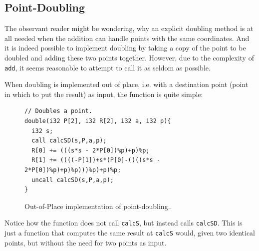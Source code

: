 \subsection{Point-Doubling}
The observant reader might be wondering, why an explicit doubling method is at all needed when the addition can handle points with the same coordinates. And it is indeed possible to implement doubling by taking a copy of the point to be doubled and adding these two points together. However, due to the complexity of \texttt{add}, it seems reasonable to attempt to call it as seldom as possible.

When doubling is implemented out of place, i.e. with a destination point (point in which to put the result) as input, the function is quite simple:
\begin{figure}[H]
\begin{Verbatim}
// Doubles a point.
double(i32 P[2], i32 R[2], i32 a, i32 p){ 
  i32 s;
  call calcSD(s,P,a,p);
  R[0] += (((s*s - 2*P[0])%p)+p)%p;
  R[1] += ((((-P[1])+s*(P[0]-((((s*s - 2*P[0])%p)+p)%p)))%p)+p)%p;
  uncall calcSD(s,P,a,p);
}
\end{Verbatim}
\caption{Out-of-Place implementation of point-doubling..}
\end{figure}
Notice how the function does not call \texttt{calcS}, but instead calls \texttt{calcSD}. This is just a function that computes the same result at \texttt{calcS} would, given two identical points, but without the need for two points as input.

